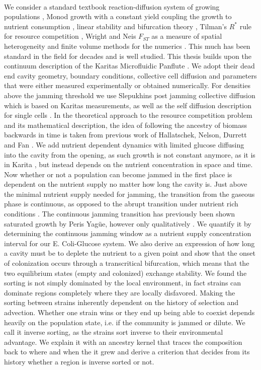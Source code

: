 \documentclass[11pt,a4paper]{report}
\begin{document}
	\\
	We consider a standard textbook reaction-diffusion system of growing populations \cite{Murray, Murray2}, Monod growth with a constant yield coupling the growth to nutrient consumption \cite{Monod, Lendenmann}, linear stability and bifurcation theory \cite{bifurcation}, Tilman's $R^*$ rule for resource competition \cite{rstar}, Wright and Neis $F_{ST}$ as a measure of spatial heterogeneity \cite{Nei} and finite volume methods for the numerics \cite{Leveque}. This much has been standard in the field for decades and is well studied. This thesis builds upon the continuum description of the Karitas Microfluidic Panflute \cite{Karita}. We adopt their dead end cavity geometry, boundary conditions, collective cell diffusion and parameters that were either measured experimentally or obtained numerically. For densities above the jamming threshold we use Slepukhins post jamming collective diffusion which is based on Karitas measurements, as well as the self diffusion description for single cells \cite{slepukhin}. In the theoretical approach to the resource competition problem and its mathematical description, the idea of following the ancestry of biomass backwards in time is taken from previous work of Hallatschek, Nelson, Durrett and Fan \cite{gene, lifeexp, tracer}. We add nutrient dependent dynamics with limited glucose diffusing into the cavity from the opening, as such growth is not constant anymore, as it is in Karita \cite{Karita}, but instead depends on the nutrient concentration in space and time. Now whether or not a population can become jammed in the first place is dependent on the nutrient supply no matter how long the cavity is. Just above the minimal nutrient supply needed for jamming, the transition from the gaseous phase is continuous, as opposed to the abrupt transition under nutrient rich conditions \cite{Karita}. The continuous jamming transition has previously been shown saturated growth by Peris Yagüe, however only qualitatively \cite{peris}. We quantify it by determining the continuous jamming window as a nutrient supply concentration interval for our E. Coli-Glucose system. We also derive an expression of how long a cavity must be to deplete the nutrient to a given point and show that the onset of colonization occurs through a transcritical bifurcation, which means that the two equilibrium states (empty and colonized) exchange stability. We found the sorting is not simply dominated by the local environment, in fact strains can dominate regions completely where they are locally disfavored. Making the sorting between strains inherently dependent on the history of selection and advection. Whether one strain wins or they end up being able to coexist depends heavily on the population state, i.e. if the community is jammed or dilute. We call it inverse sorting, as the strains sort inverse to their environmental advantage. We explain it with an ancestry kernel that traces the composition back to where and when the it grew and derive a criterion that decides from its history whether a region is inverse sorted or not.\\
\end{document}
